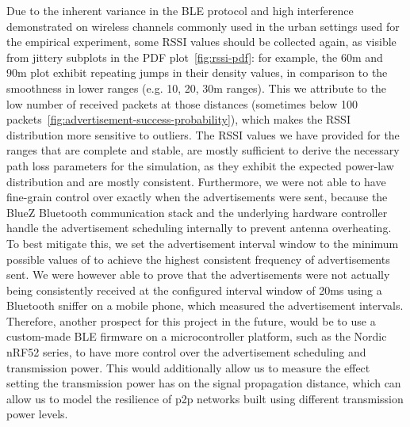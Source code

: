 Due to the inherent variance in the BLE protocol and high interference demonstrated on wireless channels commonly used in the urban settings used for the empirical experiment, some RSSI values should be collected again, as visible from jittery subplots in the PDF plot~\ref{fig:rssi-pdf}: for example, the 60m and 90m plot exhibit repeating jumps in their density values, in comparison to the smoothness in lower ranges (e.g. 10, 20, 30m ranges).
This we attribute to the low number of received packets at those distances (sometimes below 100 packets~\ref{fig:advertisement-success-probability}), which makes the RSSI distribution more sensitive to outliers.
The RSSI values we have provided for the ranges that are complete and stable, are mostly sufficient to derive the necessary path loss parameters for the simulation, as they exhibit the expected power-law distribution and are mostly consistent. 
Furthermore, we were not able to have fine-grain control over exactly when the advertisements were sent, because the BlueZ Bluetooth communication stack and the underlying hardware controller handle the advertisement scheduling internally to prevent antenna overheating.
To best mitigate this, we set the advertisement interval window to the minimum possible values of to achieve the highest consistent frequency of advertisements sent.
We were however able to prove that the advertisements were not actually being consistently received at the configured interval window of 20ms using a Bluetooth sniffer on a mobile phone, which measured the advertisement intervals.
Therefore, another prospect for this project in the future, would be to use a custom-made BLE firmware on a microcontroller platform, such as the Nordic nRF52 series, to have more control over the advertisement scheduling and transmission power.
This would additionally allow us to measure the effect setting the transmission power has on the signal propagation distance, which can allow us to model the resilience of p2p networks built using different transmission power levels.